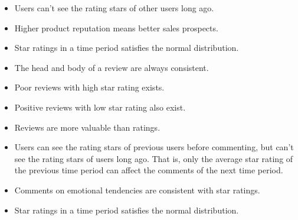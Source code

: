 \documentclass{mcmthesis}
\begin{document}
\begin{itemize}
	\item Users can't see the rating stars of other users long ago. 
	
	\item Higher product reputation means better sales prospects.
	
	\item Star ratings in a time period satisfies the normal distribution.
	\item The head and body of a review are always consistent.
	\item Poor reviews with high star rating exists.
	\item Positive reviews with low star rating also exist.
	\item Reviews are more valuable than ratings.
	\item Users can see the rating stars of previous users before commenting, but can't see the rating stars of users long ago. That is, only the average star rating of the previous time period can affect the comments of the next time period.
	
	\item Comments on emotional tendencies are consistent with star ratings.
	
	\item Star ratings in a time period satisfies the normal distribution.
	

\end{itemize}
\end{document}
